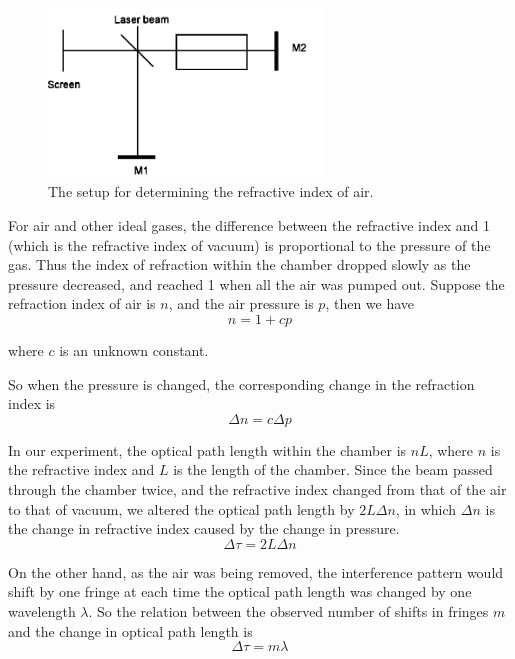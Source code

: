 \documentclass[12pt]{article}
\begin{document}
\begin{figure}[htb]

	\begin{center}
		\includegraphics[width=0.65\textwidth]{picture2} %
		\caption{The setup for determining the refractive index of air.}
	\end{center}
\end{figure}

For air and other ideal gases, the difference between the refractive index and 1 (which is the refractive index of vacuum) is proportional to the pressure of the gas. Thus the index of refraction within the chamber dropped slowly as the pressure decreased, and reached 1 when all the air was pumped out. Suppose the refraction index of air is $n$, and the air pressure is $p$, then we have
\begin{equation}
	n=1+cp
\end{equation}

where $c$ is an unknown constant. 

So when the pressure is changed, the corresponding change in the refraction index is
\begin{equation}
\Delta{n}=c\Delta{p}
\end{equation} 

In our experiment, the optical path length within the chamber is $nL$, where $n$ is the refractive index and $L$ is the length of the chamber. Since the beam passed through the chamber twice, and the refractive index changed from that of the air to that of vacuum, we altered the optical path length by $2L\Delta{n}$, in which $\Delta{n}$ is the change in refractive index caused by the change in pressure. 
\begin{equation}
	\Delta{\tau}=2L\Delta{n}
\end{equation}

On the other hand, as the air was being removed, the interference pattern would shift by one fringe at each time the optical path length was changed by one wavelength $\lambda$. So the relation between the observed number of shifts in fringes $m$ and the change in optical path length is 
\begin{equation}
	\Delta{\tau}=m\lambda
\end{equation}
\end{document}

